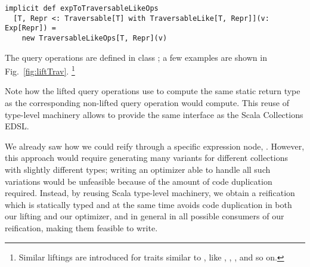 \begin{lstlisting}
implicit def expToTraversableLikeOps
  [T, Repr <: Traversable[T] with TraversableLike[T, Repr]](v: Exp[Repr]) =
    new TraversableLikeOps[T, Repr](v)
\end{lstlisting}

The query operations are defined in class ; a few examples are shown in Fig.~\ref{fig:liftTrav}.%
\footnote{Similar liftings are introduced for traits similar to , like , , , and so on.}

Note how the lifted query operations use  to compute the same static return type as the corresponding non-lifted query operation would compute. This reuse of type-level machinery allows {\LoS} to provide the same interface as the Scala Collections EDSL\@.

We already saw how we could reify  through a specific expression node, . However, this approach would require generating many variants for different collections with slightly different types; writing an optimizer able to handle all such variations would be unfeasible because of the amount of code duplication required.
Instead, by reusing Scala type-level machinery, we obtain a reification which is statically typed and at the same time avoids code duplication in both our lifting and our optimizer, and in general in all possible consumers of our reification, making them feasible to write.




